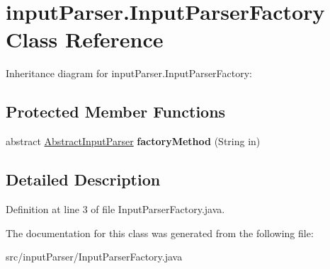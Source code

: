 \hypertarget{classinput_parser_1_1_input_parser_factory}{\section{input\-Parser.\-Input\-Parser\-Factory Class Reference}
\label{classinput_parser_1_1_input_parser_factory}
}


Inheritance diagram for input\-Parser.\-Input\-Parser\-Factory\-:
\subsection*{Protected Member Functions}
\begin{DoxyCompactItemize}
\item 
\hypertarget{classinput_parser_1_1_input_parser_factory_a48971c2679b589f34a7051e795d48c49}{abstract \hyperlink{classinput_parser_1_1_abstract_input_parser}{Abstract\-Input\-Parser} {\bfseries factory\-Method} (String in)}\label{classinput_parser_1_1_input_parser_factory_a48971c2679b589f34a7051e795d48c49}

\end{DoxyCompactItemize}


\subsection{Detailed Description}


Definition at line 3 of file Input\-Parser\-Factory.\-java.



The documentation for this class was generated from the following file\-:\begin{DoxyCompactItemize}
\item 
src/input\-Parser/Input\-Parser\-Factory.\-java\end{DoxyCompactItemize}
